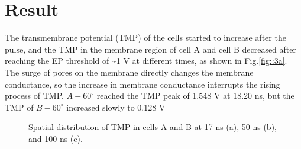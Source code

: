 \documentclass[conference]{IEEEtran}
\begin{document}
\section{Result}
The transmembrane potential (TMP) of the cells started to increase after the pulse, and the TMP in the membrane region of cell A and cell B decreased after reaching the EP threshold of \textasciitilde1 V at different times\cite{smith2008active}, as shown in Fig.\ref{fig::3a}. The surge of pores on the membrane directly changes the membrane conductance, so the increase in membrane conductance interrupts the rising process of TMP. $A-60^{\circ}$ reached the TMP peak of 1.548 V at 18.20 ns, but the TMP of $B-60^{\circ}$ increased slowly to 0.128 V \begin{figure}[htbp]
	\centering
	
	\caption{Spatial distribution of TMP in cells A and B at 17 ns (a), 50 ns (b), and 100 ns (c).}
	\label{fig::4}
\end{figure}
\end{document}
